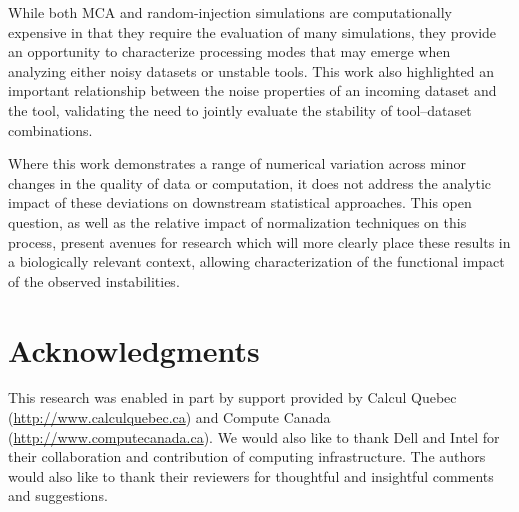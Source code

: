 \documentclass[fleqn,12pt]{SelfArx_ch} %
\begin{document}
While both MCA and random-injection simulations are computationally expensive in that they require the evaluation of
many simulations, they provide an opportunity to characterize processing modes that may emerge when analyzing either
noisy datasets or unstable tools. This work also highlighted an important relationship between the noise properties of
an incoming dataset and the tool, validating the need to jointly evaluate the stability of tool--dataset combinations.

Where this work demonstrates a range of numerical variation across minor changes in the quality of data or computation,
it does not address the analytic impact of these deviations on downstream statistical approaches. This open question,
as well as the relative impact of normalization techniques on this process, present avenues for research which will
more clearly place these results in a biologically relevant context, allowing characterization of the functional impact
of the observed instabilities.

\section*{Acknowledgments}
This research was enabled in part by support provided by Calcul Quebec
(\href{http://www.calculquebec.ca}{http://www.calculquebec.ca}) and Compute Canada (\href{http://www.computecanada.ca}{http://www.computecanada.ca}). We would also
like to thank Dell and Intel for their collaboration and contribution of computing infrastructure. The authors would
also like to thank their reviewers for thoughtful and insightful comments and suggestions.

{\small 


}
\end{document}
